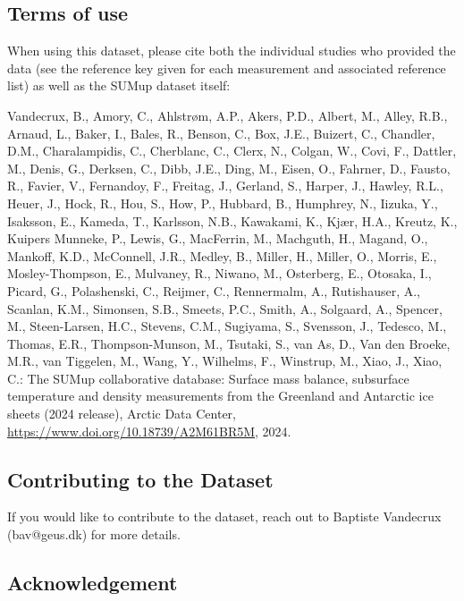 \documentclass[journal abbreviation, manuscript]{copernicus}
\begin{document}
\subsection{Terms of use}

When using this dataset, please cite both the individual studies who provided the data (see the reference key given for each measurement and associated reference list) as well as the SUMup dataset itself: 

\bigskip

Vandecrux, B., Amory, C., Ahlstrøm, A.P., Akers, P.D., Albert, M., Alley, R.B., Arnaud, L., Baker, I., Bales, R., Benson, C., Box, J.E., Buizert, C., Chandler, D.M., Charalampidis, C., Cherblanc, C., Clerx, N., Colgan, W., Covi, F., Dattler, M., Denis, G., Derksen, C., Dibb, J.E., Ding, M., Eisen, O., Fahrner, D., Fausto, R., Favier, V., Fernandoy, F., Freitag, J., Gerland, S., Harper, J., Hawley, R.L., Heuer, J., Hock, R., Hou, S., How, P., Hubbard, B., Humphrey, N., Iizuka, Y., Isaksson, E., Kameda, T., Karlsson, N.B., Kawakami, K., Kjær, H.A., Kreutz, K., Kuipers Munneke, P., Lewis, G., MacFerrin, M., Machguth, H., Magand, O., Mankoff, K.D., McConnell, J.R., Medley, B., Miller, H., Miller, O., Morris, E., Mosley-Thompson, E., Mulvaney, R., Niwano, M., Osterberg, E., Otosaka, I., Picard, G., Polashenski, C., Reijmer, C., Rennermalm, A., Rutishauser, A., Scanlan, K.M., Simonsen, S.B., Smeets, P.C., Smith, A., Solgaard, A., Spencer, M., Steen-Larsen, H.C., Stevens, C.M., Sugiyama, S., Svensson, J., Tedesco, M., Thomas, E.R., Thompson-Munson, M., Tsutaki, S., van As, D., Van den Broeke, M.R., van Tiggelen, M., Wang, Y., Wilhelms, F., Winstrup, M., Xiao, J., Xiao, C.: The SUMup collaborative database: Surface mass balance, subsurface temperature and density measurements from the Greenland and Antarctic ice sheets (2024 release), Arctic Data Center, \url{https://www.doi.org/10.18739/A2M61BR5M}, 2024.

\subsection{Contributing to the Dataset}
If you would like to contribute to the dataset, reach out to Baptiste Vandecrux (bav@geus.dk) for more details.

\subsection{Acknowledgement}
\end{document}
